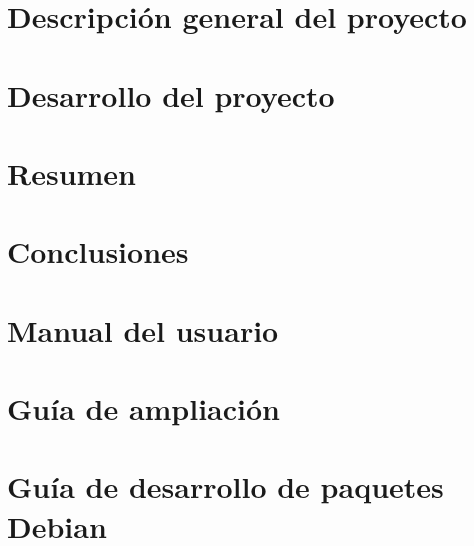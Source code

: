 \documentclass[a4paper,12pt]{scrbook}
\begin{document}
\chapter{Descripción general del proyecto}

 
\chapter{Desarrollo del proyecto}


\chapter{Resumen}
%
 
\chapter{Conclusiones}
%

\chapter{Manual del usuario}
%
 
\chapter{Guía de ampliación}
%

\appendix

\chapter{Guía de desarrollo de paquetes Debian}
%







\printindex
\end{document}
